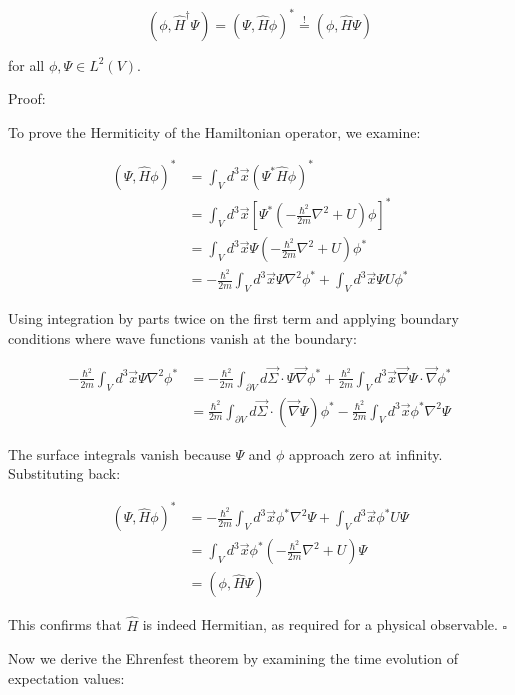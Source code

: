 \documentclass[10pt]{article}
\begin{document}
\begin{equation*}
(\phi, \hat{H}^\dagger\Psi) = (\Psi, \hat{H}\phi)^* \stackrel{!}{=} (\phi, \hat{H}\Psi) \tag{1.82}
\end{equation*}

for all $\phi, \Psi \in L^2(V)$.

Proof:


To prove the Hermiticity of the Hamiltonian operator, we examine:

\begin{align*}
(\Psi, \hat{H}\phi)^* &= \int_V d^3\vec{x}(\Psi^*\hat{H}\phi)^* \\
&= \int_V d^3\vec{x}\left[\Psi^*\left(-\frac{\hbar^2}{2m}\nabla^2 + U\right)\phi\right]^* \\
&= \int_V d^3\vec{x}\Psi\left(-\frac{\hbar^2}{2m}\nabla^2 + U\right)\phi^* \tag{1.83} \\
&= -\frac{\hbar^2}{2m}\int_V d^3\vec{x}\Psi\nabla^2\phi^* + \int_V d^3\vec{x}\Psi U\phi^*
\end{align*}

Using integration by parts twice on the first term and applying boundary conditions where wave functions vanish at the boundary:

\begin{align*}
-\frac{\hbar^2}{2m}\int_V d^3\vec{x}\Psi\nabla^2\phi^* &= -\frac{\hbar^2}{2m}\int_{\partial V}d\vec{\Sigma}\cdot\Psi\vec{\nabla}\phi^* + \frac{\hbar^2}{2m}\int_V d^3\vec{x}\vec{\nabla}\Psi\cdot\vec{\nabla}\phi^* \tag{1.84} \\
&= \frac{\hbar^2}{2m}\int_{\partial V}d\vec{\Sigma}\cdot(\vec{\nabla}\Psi)\phi^* - \frac{\hbar^2}{2m}\int_V d^3\vec{x}\phi^*\nabla^2\Psi
\end{align*}

The surface integrals vanish because $\Psi$ and $\phi$ approach zero at infinity. Substituting back:

\begin{align*}
(\Psi, \hat{H}\phi)^* &= -\frac{\hbar^2}{2m}\int_V d^3\vec{x}\phi^*\nabla^2\Psi + \int_V d^3\vec{x}\phi^*U\Psi \\
&= \int_V d^3\vec{x}\phi^*\left(-\frac{\hbar^2}{2m}\nabla^2 + U\right)\Psi \\
&= (\phi, \hat{H}\Psi) \tag{1.85}
\end{align*}

This confirms that $\hat{H}$ is indeed Hermitian, as required for a physical observable. $\square$

Now we derive the Ehrenfest theorem by examining the time evolution of expectation values:
\end{document}

